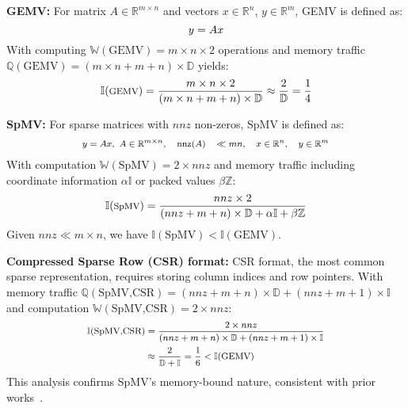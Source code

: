 \noindent\textbf{GEMV:}
For matrix $A \in \mathbb{R}^{m \times n}$ and vectors $x \in \mathbb{R}^n$, $y \in \mathbb{R}^m$, GEMV is defined as:
\begin{equation}\footnotesize
y = Ax
\end{equation}
With computing $\mathbb{W}(\text{GEMV})=m\times n\times2$ operations and memory traffic $\mathbb{Q}(\text{GEMV})=(m\times n+m+n)\times\mathbb{D}$ yields:
\begin{equation}\footnotesize
\mathbb{I}(\text{GEMV})=\frac{m\times n\times2}{(m\times n+m+n)\times\mathbb{D}}
\approx \frac{2}{\mathbb{D}}=\frac{1}{4}
\end{equation}

\noindent\textbf{SpMV:}
For sparse matrices with $nnz$ non-zeros, SpMV is defined as:
\begin{equation}\footnotesize
\begin{aligned}
y &= Ax, \
A \in \mathbb{R}^{m \times n}, \quad \text{nnz}(A) &\ll mn, \quad
x \in \mathbb{R}^n, \quad y \in \mathbb{R}^m
\end{aligned}
\end{equation}
With computation $\mathbb{W}(\text{SpMV})=2\times nnz$ and memory traffic including coordinate information $\alpha\mathbb{I}$ or packed values $\beta\mathbb{Z}$:
\begin{equation}\footnotesize
\mathbb{I}(\text{SpMV})=\frac{nnz\times2}{(nnz+m+n)\times\mathbb{D}+\alpha\mathbb{I} +\beta\mathbb{Z}}
\end{equation}
Given $nnz\ll m\times n$, we have $\mathbb{I}(\text{SpMV})<\mathbb{I}(\text{GEMV})$.

\noindent\textbf{Compressed Sparse Row (CSR) format:}
CSR format, the most common sparse representation, requires storing column indices and row pointers. With memory traffic $\mathbb{Q}(\text{SpMV,CSR})=(nnz+m+n)\times\mathbb{D}+(nnz+m+1)\times\mathbb{I}$ and computation $\mathbb{W}(\text{SpMV,CSR})=2\times nnz$:
\begin{equation}\footnotesize
\begin{split}
\mathbb{I}(\text{SpMV,CSR})&=\frac{2\times nnz}{(nnz+m+n)\times\mathbb{D}+(nnz+m+1)\times\mathbb{I}} \\
&\approx \frac{2}{\mathbb{D}+\mathbb{I}}=\frac{1}{6}<\mathbb{I}(\text{GEMV})
\end{split}
\end{equation}
This analysis confirms SpMV's memory-bound nature, consistent with prior works~\cite{10.1145/1816038.1816021,10.1145/3577193.3593705}.

